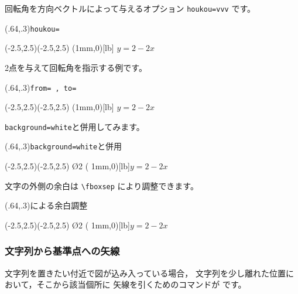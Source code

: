 回転角を方向ベクトルによって与えるオプション
\texttt{houkou=vvv} です。

\begin{showEx}(.64,.3){\texttt{houkou=}}
\footnotesize
\begin{zahyou}(-2.5,2.5)(-2.5,2.5)
\Put{}
\Put{}
\Tyokusen\A\B{}{}
\Subvec\B\A\AB
\Put[houkou=\AB]\A(1mm,0)[lb]{%
$y=2-2x$}
\end{zahyou}
\end{showEx}

2点を与えて回転角を指示する例です。
\begin{showEx}(.64,.3){\texttt{from= , to= }}
\footnotesize
\begin{zahyou}(-2.5,2.5)(-2.5,2.5)
\Put{}
\Put{}
\Tyokusen\A\B{}{}
\Put[from=\A,to=\B]\A(1mm,0)[lb]{%
$y=2-2x$}
\end{zahyou}
\end{showEx}

\texttt{background=white}と併用してみます。

\begin{showEx}(.64,.3){\texttt{background=white}と併用}
\footnotesize
\begin{zahyou}(-2.5,2.5)(-2.5,2.5)
\Put{}
\Put{}
\En*\O{2}
\Tyokusen\A\B{}{}
\Put[background=white,from=\A,to=\B]\A(%
1mm,0)[lb]{$y=2-2x$}
\end{zahyou}
\end{showEx}

文字の外側の余白は \verb/\fboxsep/ により調整できます。

\begin{showEx}(.64,.3){による余白調整}
\footnotesize
\begin{zahyou}(-2.5,2.5)(-2.5,2.5)
\Put{}
\Put{}
\En*\O{2}
\Tyokusen\A\B{}{}
{\fboxsep=0pt
\Put[background=white,from=\A,to=\B]\A(%
1mm,0)[lb]{$y=2-2x$}}
\end{zahyou}
\end{showEx}

\subsubsection{文字列から基準点への矢線}
文字列を置きたい付近で図が込み入っている場合，
文字列を少し離れた位置において，そこから該当個所に
矢線を引くためのコマンドが  です。


